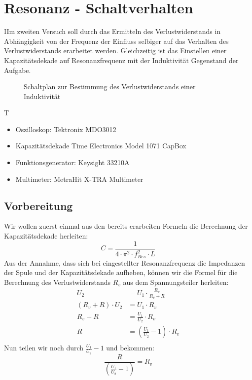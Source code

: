 \documentclass{article}
\begin{document}
\section{Resonanz - Schaltverhalten}
\begin{task}
  IIm zweiten Versuch soll durch das Ermitteln des Verlustwiderstands in Abhängigkeit von der Frequenz der Einfluss selbiger auf das Verhalten des Verlustwiderstands erarbeitet werden.
  Gleichzeitig ist das Einstellen einer Kapazitätsdekade auf Resonanzfrequenz mit der Induktivität Gegenstand der Aufgabe.
\end{task}
\begin{figure}[h]
  \begin{center}

    \caption{Schaltplan zur Bestimmung des Verlustwiderstands einer Induktivität}
  \end{center}
\end{figure}
\begin{devlist}
  T
  \begin{itemize}
    \item Oszilloskop: Tektronix MDO3012
    \item Kapazitätsdekade Time Electronics Model 1071 CapBox
    \item Funktionsgenerator: Keysight 33210A
    \item Multimeter: MetraHit X-TRA Multimeter
  \end{itemize}
\end{devlist}
\subsection{Vorbereitung}

Wir wollen zuerst einmal aus den bereits erarbeiten Formeln die Berechnung der Kapazitätsdekade herleiten:
\begin{equation}
  C = \frac{1}{4\cdot\pi^2\cdot f_{Res}^2 \cdot L}
\end{equation}
Aus der Annahme, dass sich bei eingestellter Resonanzfrequenz die Impedanzen der Spule und der Kapazitätsdekade aufheben, können wir die Formel
für die Berechnung des Verlustwiderstands $R_v$ aus dem Spannungsteiler herleiten:
\begin{align*}
  U_2                           & = U_1 \cdot \frac{R_v}{R_v+R}                \\
  \left(R_v + R\right)\cdot U_2 & = U_1 \cdot R_v                              \\
  R_v + R                       & = \frac{U_1}{U_2} \cdot R_v                  \\
  R                             & = \left(\frac{U_1}{U_2} - 1\right) \cdot R_v \\
\end{align*}
Nun teilen wir noch durch $\frac{U_1}{U_2} - 1$ und bekommen:
\begin{equation}
  \frac{R}{\left(\frac{U_1}{U_2} - 1\right)}  = R_v
\end{equation}
\end{document}
